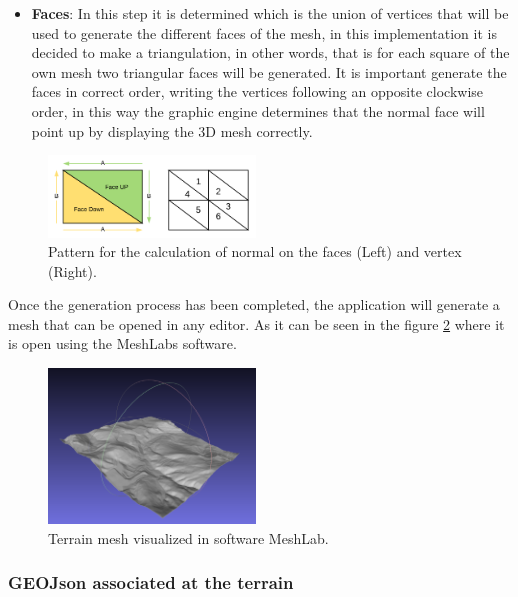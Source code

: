 \documentclass[10pt,a4paper,twocolumn,twoside]{article}
\begin{document}
\begin{itemize}
  \item \textbf{Faces}: In this step it is determined which is the union of vertices that will be used to generate the different faces of the mesh, in this implementation it is decided to make a triangulation, in other words, that is for each square of the own mesh two triangular faces will be generated. It is important generate the faces in correct order, writing the vertices following an opposite clockwise order, in this way the graphic engine determines that the normal face will point up by displaying the 3D mesh correctly.
\end{itemize}

\begin{figure}[!h]
\centering
  	\includegraphics[width=0.49\textwidth]{patternmeshgeneration}
	\caption{Pattern for the calculation of normal on the faces (Left) and vertex (Right).}
	\label{fig-normalpattern}
\end{figure}

Once the generation process has been completed, the application will generate a mesh that can be opened in any editor. As it can be seen in the figure \ref{fig-meshlab} where it is open using the MeshLabs software.

\begin{figure}[!h]
\centering
  	\includegraphics[width=0.49\textwidth]{mesh_example_meshlab}
	\caption{Terrain mesh visualized in software MeshLab.}
	\label{fig-meshlab}
\end{figure}

\subsubsection{GEOJson associated at the terrain}
\end{document}
